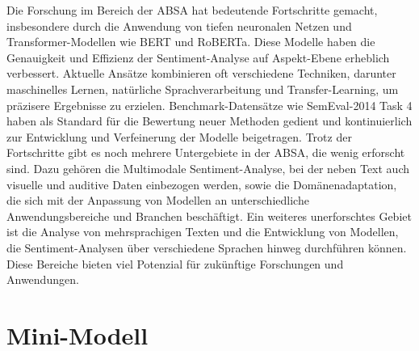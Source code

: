 \documentclass[12pt]{article}
\begin{document}
Die Forschung im Bereich der ABSA hat bedeutende Fortschritte gemacht, insbesondere durch die Anwendung von tiefen neuronalen Netzen und 
Transformer-Modellen wie BERT und RoBERTa. Diese Modelle haben die Genauigkeit und Effizienz der Sentiment-Analyse auf Aspekt-Ebene erheblich 
verbessert. Aktuelle Ansätze kombinieren oft verschiedene Techniken, darunter maschinelles Lernen, natürliche Sprachverarbeitung und Transfer-Learning, 
um präzisere Ergebnisse zu erzielen. Benchmark-Datensätze wie SemEval-2014 Task 4 haben als Standard für die Bewertung neuer Methoden gedient und 
kontinuierlich zur Entwicklung und Verfeinerung der Modelle beigetragen.
\newline
\newline
Trotz der Fortschritte gibt es noch mehrere Untergebiete in der ABSA, die wenig erforscht sind. Dazu gehören die Multimodale Sentiment-Analyse, bei der 
neben Text auch visuelle und auditive Daten einbezogen werden, sowie die Domänenadaptation, die sich mit der Anpassung von Modellen an unterschiedliche 
Anwendungsbereiche und Branchen beschäftigt. Ein weiteres unerforschtes Gebiet ist die Analyse von mehrsprachigen Texten und die Entwicklung von 
Modellen, die Sentiment-Analysen über verschiedene Sprachen hinweg durchführen können. Diese Bereiche bieten viel Potenzial für zukünftige Forschungen 
und Anwendungen.

\section{Mini-Modell}
\end{document}
